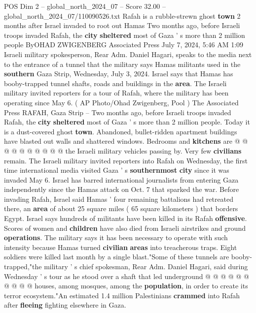 \begin{textsample}{POS Dim 2 – global\_north\_2024\_07 – Score 32.00 – global\_north\_2024\_07/110090526.txt}  \label{ex:f2_pos_381}
Rafah is a rubble-strewn ghost \textbf{town} 2 months after Israel invaded to root out Hamas Two months ago, before Israeli troops invaded Rafah, the \textbf{city} \textbf{sheltered} most of Gaza ' s more than 2 million people ByOHAD ZWIGENBERG Associated Press July 7, 2024, 5:46 AM 1:09 Israeli military spokesperson, Rear Adm.
Daniel Hagari, speaks to the media next to the entrance of a tunnel that the military says Hamas militants used in the \textbf{southern} Gaza Strip, Wednesday, July 3, 2024.
Israel says that Hamas has booby-trapped tunnel shafts, roads and buildings in the \textbf{area}.
The Israeli military invited reporters for a tour of Rafah, where the military has been operating since May 6. ( AP Photo/Ohad Zwigenberg, Pool ) The Associated Press RAFAH, Gaza Strip -- Two months ago, before Israeli troops invaded Rafah, the \textbf{city} \textbf{sheltered} most of Gaza ' s more than 2 million people.
Today it is a dust-covered ghost \textbf{town}.
Abandoned, bullet-ridden apartment buildings have blasted out walls and shattered windows.
Bedrooms and \textbf{kitchens} are @ @ @ @ @ @ @ @ @ @ the Israeli military vehicles passing by.
Very few \textbf{civilians} remain.
The Israeli military invited reporters into Rafah on Wednesday, the first time international media visited Gaza ' s \textbf{southernmost} \textbf{city} since it was invaded May 6.
Israel has barred international journalists from entering Gaza independently since the Hamas attack on Oct. 7 that sparked the war.
Before invading Rafah, Israel said Hamas ' four remaining battalions had retreated there, an \textbf{area} of about 25 square miles ( 65 square kilometers ) that borders Egypt.
Israel says hundreds of militants have been killed in its Rafah \textbf{offensive}.
Scores of women and \textbf{children} have also died from Israeli airstrikes and ground \textbf{operations}.
The military says it has been necessary to operate with such intensity because Hamas turned \textbf{civilian} \textbf{areas} into treacherous traps.
Eight soldiers were killed last month by a single blast."Some of these tunnels are booby-trapped,"the military ' s chief spokesman, Rear Adm.
Daniel Hagari, said during Wednesday ' s tour as he stood over a shaft that led underground @ @ @ @ @ @ @ @ @ @ houses, among mosques, among the \textbf{population}, in order to create its terror ecosystem."An estimated 1.4 million Palestinians \textbf{crammed} into Rafah after \textbf{fleeing} fighting elsewhere in Gaza.

\end{textsample}
